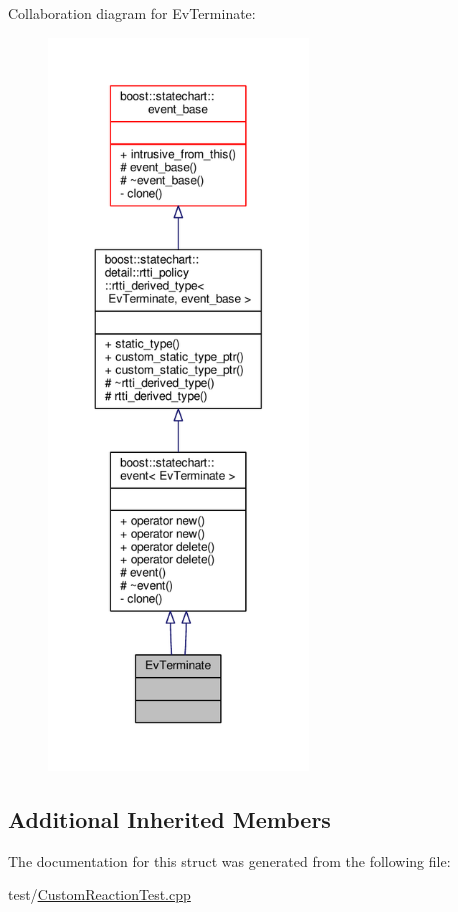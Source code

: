 Collaboration diagram for Ev\+Terminate\+:
\nopagebreak
\begin{figure}[H]
\begin{center}
\leavevmode
\includegraphics[height=550pt]{struct_ev_terminate__coll__graph}
\end{center}
\end{figure}
\subsection*{Additional Inherited Members}


The documentation for this struct was generated from the following file\+:\begin{DoxyCompactItemize}
\item 
test/\mbox{\hyperlink{_custom_reaction_test_8cpp}{Custom\+Reaction\+Test.\+cpp}}\end{DoxyCompactItemize}

